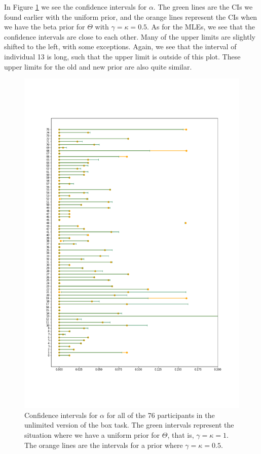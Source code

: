 In Figure \ref{fig:sensitivity_unlim_cis_alpha} we see the confidence intervals for $\alpha$. The green lines are the CIs we found earlier with the uniform prior, and the orange lines represent the CIs when we have the beta prior for $\Theta$ with $\gamma=\kappa=0.5$. As for the MLEs, we see that the confidence intervals are close to each other. Many of the upper limits are slightly shifted to the left, with some exceptions. Again, we see that the interval of individual 13 is long, such that the upper limit is outside of this plot. These upper limits for the old and new prior are also quite similar. 
\begin{figure}
    \centering
    \includegraphics[scale=0.37]{pictures/Sensitivity/ci_unlim_alpha.png}
    \caption[CIs for $\alpha$ for all participants with two different priors, unlimited]{
    Confidence intervals for $\alpha$ for all of the 76 participants in the unlimited version of the box task. The green intervals represent the situation where we have a uniform prior for $\Theta$, that is, $\gamma=\kappa=1$. The orange lines are the intervals for a prior where $\gamma=\kappa=0.5$.}
    \label{fig:sensitivity_unlim_cis_alpha}
\end{figure}


